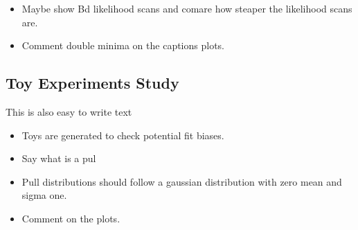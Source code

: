 

\begin{itemize}
\item {\color{red} Maybe show Bd likelihood scans and comare how steaper the likelihood scans are.}
\item Comment double minima on the captions plots.
\end{itemize}

\subsection{Toy Experiments Study}

{\color{red} This is also easy to write text}
\begin{itemize}
\item Toys are generated to check potential fit biases.
\item Say what is a pul
\item Pull distributions should follow a gaussian distribution with zero mean and sigma one.
\item Comment on the plots.
\end{itemize}

